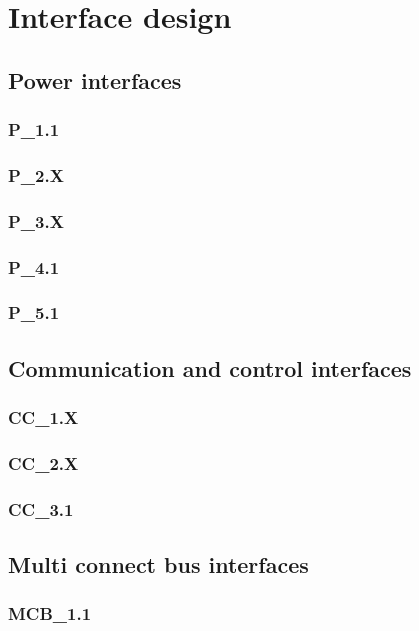 \documentclass[Main]{subfiles}
\begin{document}
\section{Interface design}

\subsection{Power interfaces}

\subsubsection{P\_1.1}


\subsubsection{P\_2.X}


\subsubsection{P\_3.X}


\subsubsection{P\_4.1}


\subsubsection{P\_5.1}



\subsection{Communication and control interfaces}

\subsubsection{CC\_1.X}


\subsubsection{CC\_2.X}


\subsubsection{CC\_3.1}



\subsection{Multi connect bus interfaces}

\subsubsection{MCB\_1.1}
\end{document}
